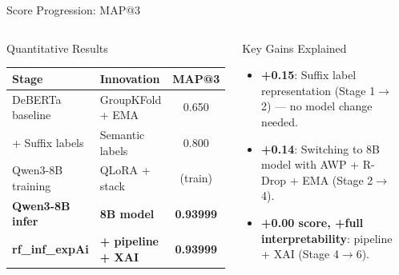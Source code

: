 ﻿\documentclass[aspectratio=169,10pt]{beamer}
\begin{document}
\begin{frame}[shrink=4]{Score Progression: MAP@3}
\begin{columns}[T]
\begin{block}{Quantitative Results}
\setlength{\tabcolsep}{5pt}
\renewcommand{\arraystretch}{1.4}
\begin{tabular}{llc}
\toprule
\textbf{Stage} & \textbf{Innovation} & \textbf{MAP@3}\\
\midrule
\rowcolor{RowTintA}
DeBERTa baseline & GroupKFold + EMA & 0.650\\
\rowcolor{RowTintB}
+ Suffix labels & Semantic labels & 0.800\\
\rowcolor{RowTintA}
\textcolor{SoftGray}{Qwen3-8B training} & \textcolor{SoftGray}{QLoRA + stack} & \textcolor{SoftGray}{(train)}\\
\rowcolor{LightGreen}
\textbf{Qwen3-8B infer} & \textbf{8B model} & \textbf{0.93999}\\
\rowcolor{LightGreen}
\textbf{rf\_inf\_expAi} & \textbf{+ pipeline + XAI} & \textbf{0.93999}\\
\bottomrule
\end{tabular}
\end{block}
\vspace{8pt}
\begin{block}{Key Gains Explained}
\begin{itemize}
  \item \textbf{+0.15}: Suffix label representation (Stage 1$\to$2) --- no model change needed.
  \item \textbf{+0.14}: Switching to 8B model with AWP + R-Drop + EMA (Stage 2$\to$4).
  \item \textbf{+0.00 score, +full interpretability}: pipeline + XAI (Stage 4$\to$6).
\end{itemize}
\end{block}
\begin{center}
\vspace{6pt}
\end{center}
\end{columns}
\end{frame}
\end{document}
